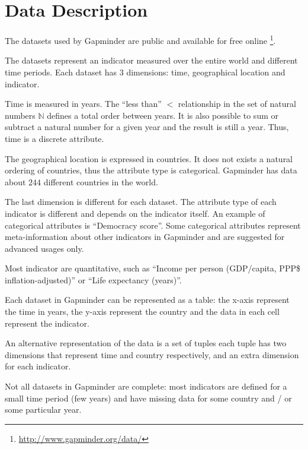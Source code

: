 \section{Data Description}
\label{sec:data}

The datasets used by Gapminder are public and available for free online \footnote{\url{http://www.gapminder.org/data/}}.

The datasets represent an indicator measured over the entire world and different time periods.
Each dataset has $3$ dimensions: time, geographical location and indicator.

Time is measured in years.
The ``less than'' $<$ relationship in the set of natural numbers $\mathbb{N}$ defines a total order between years.
It is also possible to sum or subtract a natural number for a given year and the result is still a year.
Thus, time is a discrete attribute.

The geographical location is expressed in countries.
It does not exists a natural ordering of countries, thus the attribute type is categorical.
Gapminder has data about $244$ different countries in the world.

The last dimension is different for each dataset.
The attribute type of each indicator is different and depends on the indicator itself.
An example of categorical attributes is ``Democracy score''.
Some categorical attributes represent meta-information about other indicators in Gapminder and are suggested for advanced usages only.


Most indicator are quantitative, such as ``Income per person (GDP/capita, PPP\$ inflation-adjusted)'' or ``Life expectancy (years)''.

Each dataset in Gapminder can be represented as a table:
the x-axis represent the time in years, the y-axis represent the country and the data in each cell represent the indicator.

An alternative representation of the data is a set of tuples
each tuple has two dimensions that represent time and country respectively, and an extra dimension for each indicator.

Not all datasets in Gapminder are complete:
most indicators are defined for a small time period (few years) and have missing data for some country and / or some particular year.
